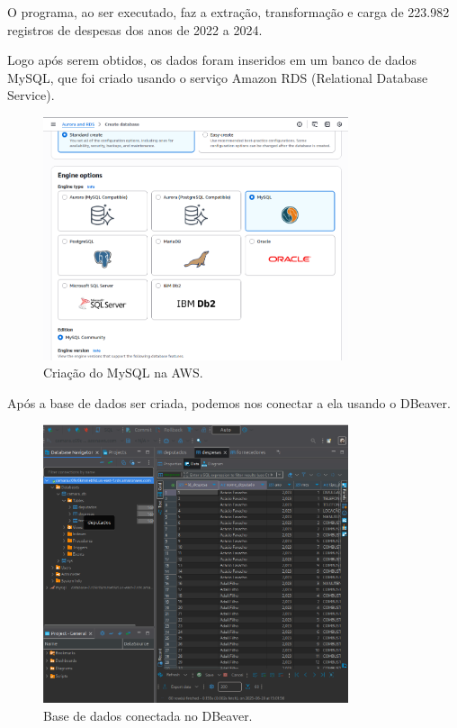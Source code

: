 \documentclass[12pt, a4paper]{article}
\begin{document}
O programa, ao ser executado, faz a extração, transformação e carga de 223.982 registros de despesas dos anos de 2022 a 2024.

Logo após serem obtidos, os dados foram inseridos em um banco de dados MySQL, que foi criado usando o serviço Amazon RDS (Relational Database Service).

\begin{figure}[!htbp]
    \centering
    \includegraphics[width=0.8\textwidth]{assets/1_criacao.png}
    \caption{Criação do MySQL na AWS.}
    \label{fig:criacao_mysql}
\end{figure}

Após a base de dados ser criada, podemos nos conectar a ela usando o DBeaver\cite{dbeaver}.

\begin{figure}[!htbp]
    \centering
    \includegraphics[width=0.8\textwidth]{assets/1_dbeaver.png}
    \caption{Base de dados conectada no DBeaver.}
    \label{fig:db conexão}
\end{figure}
\end{document}
